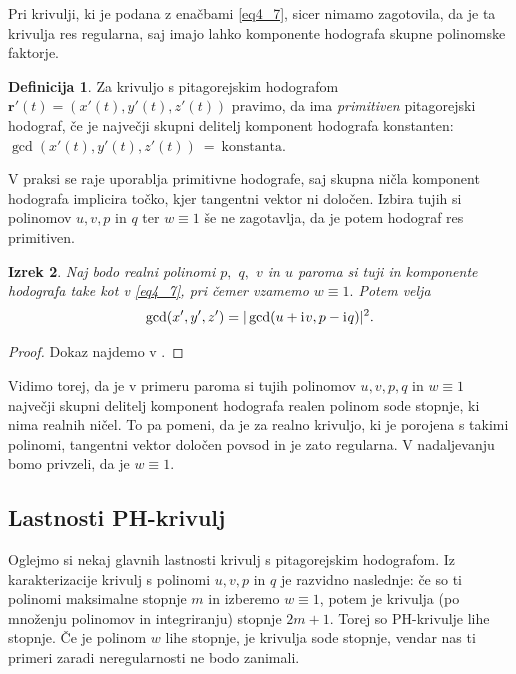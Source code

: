 \documentclass[12pt,a4paper,twoside]{article}
\newcommand{\iu}{\mathrm{i}\mkern1mu} %
\theoremstyle{definition} %
\newtheorem{definicija}{Definicija}[section]
\theoremstyle{plain} %
\newtheorem{izrek}[definicija]{Izrek}
\theoremstyle{primerstyle}
\numberwithin{equation}{section}  %
\newcommand{\rV}{\mathbf{r}}
\begin{document}
Pri krivulji, ki je podana z enačbami \eqref{eq4_7}, sicer nimamo zagotovila, da je ta krivulja res regularna, saj imajo lahko komponente hodografa skupne polinomske faktorje.

\begin{definicija}
	\label{primitiven_hodo}
	Za krivuljo s pitagorejskim hodografom $\rV'(t)=(x'(t),y'(t),z'(t))$ pravimo, da ima \emph{primitiven} pitagorejski hodograf, če je največji skupni delitelj komponent hodografa konstanten: $\gcd(x'(t),y'(t),z'(t))~=~\mathrm{konstanta}.$
\end{definicija}

V praksi se raje uporablja primitivne hodografe, saj skupna ničla komponent hodografa implicira točko, kjer tangentni vektor ni določen. Izbira tujih si polinomov $u,v,p$ in $q$ ter $w\equiv 1$ še ne zagotavlja, da je potem hodograf res primitiven. 

\begin{izrek}
	Naj bodo realni polinomi $p,$ $q,$ $v$ in $u$ paroma si tuji in komponente hodografa take kot v \eqref{eq4_7}, pri čemer vzamemo $w\equiv 1.$ Potem velja
	\begin{equation}
		\gcd(x',y',z')=|\gcd(u+\iu v,p-\iu q)|^2.
	\end{equation}
\end{izrek}
\begin{proof}
	Dokaz najdemo v \cite[str.\ 371]{faroukietal2004}.
\end{proof}

Vidimo torej, da je v primeru paroma si tujih polinomov $u,v,p,q$ in $w\equiv 1$ največji skupni delitelj komponent hodografa realen polinom sode stopnje, ki nima realnih ničel. To pa pomeni, da je za realno krivuljo, ki je porojena s takimi polinomi, tangentni vektor določen povsod in je zato regularna. V nadaljevanju bomo privzeli, da je $w\equiv 1.$

\subsection{Lastnosti PH-krivulj}
\label{subsec_lastnosti}

Oglejmo si nekaj glavnih lastnosti krivulj s pitagorejskim hodografom. Iz karakterizacije krivulj s polinomi $u,v,p$ in $q$ je razvidno naslednje: če so ti polinomi maksimalne stopnje $m$ in izberemo $w\equiv1$, potem je krivulja (po množenju polinomov in integriranju) stopnje $2m+1.$ Torej so PH-krivulje lihe stopnje. Če je polinom $w$ lihe stopnje, je krivulja sode stopnje, vendar nas ti primeri zaradi neregularnosti ne bodo zanimali.
\end{document}
